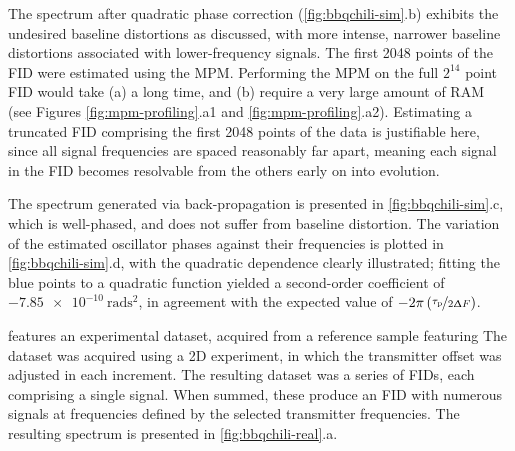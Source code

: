 The spectrum after quadratic phase correction (\cref{fig:bbqchili-sim}.b)
exhibits the undesired baseline distortions as discussed, with more intense,
narrower baseline distortions associated with lower-frequency signals.
The first 2048 points of the \ac{FID} were estimated using the \ac{MPM}.
Performing the \ac{MPM} on the full $2^{14}$ point \ac{FID} would take (a) a
long time, and (b) require a very large amount of \ac{RAM} (see Figures
\ref{fig:mpm-profiling}.a1 and \ref{fig:mpm-profiling}.a2).
Estimating a truncated \ac{FID} comprising the first 2048 points of the
data is justifiable here, since all signal frequencies are spaced
reasonably far apart, meaning each signal in the \ac{FID} becomes
resolvable from the others early on into evolution.
\label{corr:bbq-limitations}

The spectrum generated via back-propagation is presented in
\cref{fig:bbqchili-sim}.c, which is well-phased, and does not suffer from
baseline distortion. The variation of the estimated oscillator
phases against their frequencies is plotted in \cref{fig:bbqchili-sim}.d, with
the quadratic dependence clearly illustrated; fitting the blue points to a
quadratic function yielded a second-order coefficient of
$\qty{-7.85e-10}{\radian\second\squared}$, in agreement with the expected value
of $-2 \pi \left(\nicefrac{\tau_{\text{p}}}{2 \Updelta F}\right)$.

 features an experimental dataset, acquired
from a reference sample featuring
\label{corr:gd-h2o}
The dataset was acquired using a \ac{2D} experiment, in which the transmitter
offset was adjusted in each increment. The resulting dataset was a series of
\acp{FID}, each comprising a single  signal.
When summed, these produce an \ac{FID} with numerous signals at frequencies
defined by the selected transmitter frequencies. The resulting spectrum is
presented in \cref{fig:bbqchili-real}.a.

